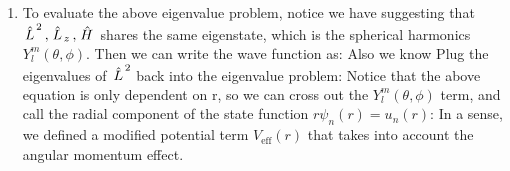 \documentclass{school-22.101-notes}
\begin{document}
\begin{enumerate}
\item To evaluate the above eigenvalue problem, notice we have
suggesting that $\left. \hat{L} \right.^2, \left. \hat{L} \right._z, \left. \hat{H} \right.$ shares the same eigenstate, which is the spherical harmonics $Y_l^m (\theta, \phi)$. Then we can write the wave function as: 
Also we know 
Plug the eigenvalues of $\left. \hat{L} \right.^2$ back into the eigenvalue problem: 
Notice that the above equation is only dependent on r, so we can cross out the $Y_l^m (\theta, \phi)$ term, and call the radial component of the state function $r \psi_n (r) = u_n (r)$: 
In a sense, we defined a modified potential term $V_{\mathrm{eff}} (r)$ that takes into account the angular momentum effect.  
\end{enumerate}
\end{document}
